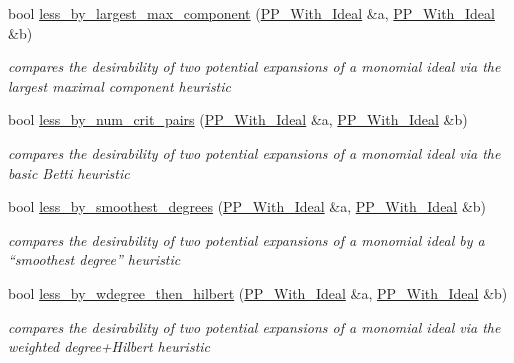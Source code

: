 \begin{DoxyCompactItemize}
bool \hyperlink{namespace_dynamic___engine_acbc39a829236f4021485cc631f030264}{less\+\_\+by\+\_\+largest\+\_\+max\+\_\+component} (\hyperlink{group___g_b_computation_class_dynamic___engine_1_1_p_p___with___ideal}{P\+P\+\_\+\+With\+\_\+\+Ideal} \&a, \hyperlink{group___g_b_computation_class_dynamic___engine_1_1_p_p___with___ideal}{P\+P\+\_\+\+With\+\_\+\+Ideal} \&b)
\begin{DoxyCompactList}\small\item\em compares the desirability of two potential expansions of a monomial ideal via the largest maximal component heuristic \end{DoxyCompactList}\item 
bool \hyperlink{namespace_dynamic___engine_ab4b77c648c1c2892cffba4dcf2a6d80a}{less\+\_\+by\+\_\+num\+\_\+crit\+\_\+pairs} (\hyperlink{group___g_b_computation_class_dynamic___engine_1_1_p_p___with___ideal}{P\+P\+\_\+\+With\+\_\+\+Ideal} \&a, \hyperlink{group___g_b_computation_class_dynamic___engine_1_1_p_p___with___ideal}{P\+P\+\_\+\+With\+\_\+\+Ideal} \&b)
\begin{DoxyCompactList}\small\item\em compares the desirability of two potential expansions of a monomial ideal via the basic Betti heuristic \end{DoxyCompactList}\item 
bool \hyperlink{namespace_dynamic___engine_aa27b3fbb646d1d0f5d35de5a69e1cb29}{less\+\_\+by\+\_\+smoothest\+\_\+degrees} (\hyperlink{group___g_b_computation_class_dynamic___engine_1_1_p_p___with___ideal}{P\+P\+\_\+\+With\+\_\+\+Ideal} \&a, \hyperlink{group___g_b_computation_class_dynamic___engine_1_1_p_p___with___ideal}{P\+P\+\_\+\+With\+\_\+\+Ideal} \&b)
\begin{DoxyCompactList}\small\item\em compares the desirability of two potential expansions of a monomial ideal by a ``smoothest degree'' heuristic \end{DoxyCompactList}\item 
bool \hyperlink{namespace_dynamic___engine_a06310dff730cbb5b133b3c907ceb6053}{less\+\_\+by\+\_\+wdegree\+\_\+then\+\_\+hilbert} (\hyperlink{group___g_b_computation_class_dynamic___engine_1_1_p_p___with___ideal}{P\+P\+\_\+\+With\+\_\+\+Ideal} \&a, \hyperlink{group___g_b_computation_class_dynamic___engine_1_1_p_p___with___ideal}{P\+P\+\_\+\+With\+\_\+\+Ideal} \&b)
\begin{DoxyCompactList}\small\item\em compares the desirability of two potential expansions of a monomial ideal via the weighted degree+\+Hilbert heuristic \end{DoxyCompactList}\item 

\end{DoxyCompactItemize}
